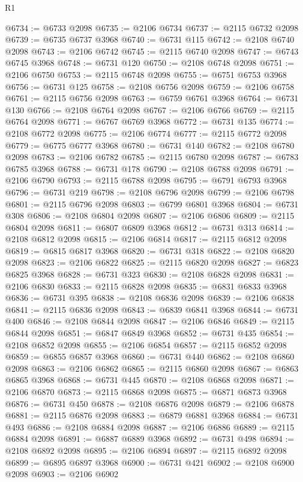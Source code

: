 \begin{lexlean}{R1}
\begin{coremodule}
@6734 := @6733 @2098
@6735 := @2106 @6734
@6737 := @2115 @6732 @2098
@6739 := @6735 @6737 @3968
@6740 := @6731 @115
@6742 := @2108 @6740 @2098
@6743 := @2106 @6742
@6745 := @2115 @6740 @2098
@6747 := @6743 @6745 @3968
@6748 := @6731 @120
@6750 := @2108 @6748 @2098
@6751 := @2106 @6750
@6753 := @2115 @6748 @2098
@6755 := @6751 @6753 @3968
@6756 := @6731 @125
@6758 := @2108 @6756 @2098
@6759 := @2106 @6758
@6761 := @2115 @6756 @2098
@6763 := @6759 @6761 @3968
@6764 := @6731 @130
@6766 := @2108 @6764 @2098
@6767 := @2106 @6766
@6769 := @2115 @6764 @2098
@6771 := @6767 @6769 @3968
@6772 := @6731 @135
@6774 := @2108 @6772 @2098
@6775 := @2106 @6774
@6777 := @2115 @6772 @2098
@6779 := @6775 @6777 @3968
@6780 := @6731 @140
@6782 := @2108 @6780 @2098
@6783 := @2106 @6782
@6785 := @2115 @6780 @2098
@6787 := @6783 @6785 @3968
@6788 := @6731 @178
@6790 := @2108 @6788 @2098
@6791 := @2106 @6790
@6793 := @2115 @6788 @2098
@6795 := @6791 @6793 @3968
@6796 := @6731 @219
@6798 := @2108 @6796 @2098
@6799 := @2106 @6798
@6801 := @2115 @6796 @2098
@6803 := @6799 @6801 @3968
@6804 := @6731 @308
@6806 := @2108 @6804 @2098
@6807 := @2106 @6806
@6809 := @2115 @6804 @2098
@6811 := @6807 @6809 @3968
@6812 := @6731 @313
@6814 := @2108 @6812 @2098
@6815 := @2106 @6814
@6817 := @2115 @6812 @2098
@6819 := @6815 @6817 @3968
@6820 := @6731 @318
@6822 := @2108 @6820 @2098
@6823 := @2106 @6822
@6825 := @2115 @6820 @2098
@6827 := @6823 @6825 @3968
@6828 := @6731 @323
@6830 := @2108 @6828 @2098
@6831 := @2106 @6830
@6833 := @2115 @6828 @2098
@6835 := @6831 @6833 @3968
@6836 := @6731 @395
@6838 := @2108 @6836 @2098
@6839 := @2106 @6838
@6841 := @2115 @6836 @2098
@6843 := @6839 @6841 @3968
@6844 := @6731 @400
@6846 := @2108 @6844 @2098
@6847 := @2106 @6846
@6849 := @2115 @6844 @2098
@6851 := @6847 @6849 @3968
@6852 := @6731 @435
@6854 := @2108 @6852 @2098
@6855 := @2106 @6854
@6857 := @2115 @6852 @2098
@6859 := @6855 @6857 @3968
@6860 := @6731 @440
@6862 := @2108 @6860 @2098
@6863 := @2106 @6862
@6865 := @2115 @6860 @2098
@6867 := @6863 @6865 @3968
@6868 := @6731 @445
@6870 := @2108 @6868 @2098
@6871 := @2106 @6870
@6873 := @2115 @6868 @2098
@6875 := @6871 @6873 @3968
@6876 := @6731 @450
@6878 := @2108 @6876 @2098
@6879 := @2106 @6878
@6881 := @2115 @6876 @2098
@6883 := @6879 @6881 @3968
@6884 := @6731 @493
@6886 := @2108 @6884 @2098
@6887 := @2106 @6886
@6889 := @2115 @6884 @2098
@6891 := @6887 @6889 @3968
@6892 := @6731 @498
@6894 := @2108 @6892 @2098
@6895 := @2106 @6894
@6897 := @2115 @6892 @2098
@6899 := @6895 @6897 @3968
@6900 := @6731 @421
@6902 := @2108 @6900 @2098
@6903 := @2106 @6902

\end{coremodule}
\end{lexlean}

